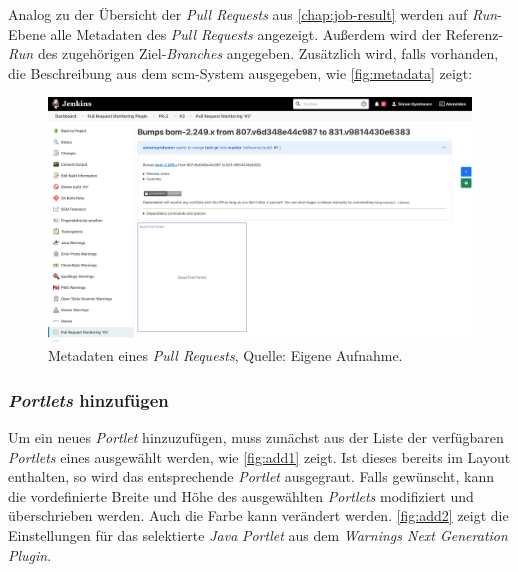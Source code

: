 Analog zu der Übersicht der \textit{Pull Requests} aus \autoref{chap:job-result} werden auf \textit{Run}-Ebene alle Metadaten des \textit{Pull Requests} angezeigt. Außerdem wird der Referenz-\textit{Run} des zugehörigen Ziel-\textit{Branches} angegeben. Zusätzlich wird, falls vorhanden, die Beschreibung aus dem \ac{scm}-System ausgegeben, wie \autoref{fig:metadata} zeigt:

\begin{figure}[h!]
\centering
\includegraphics[width=\textwidth]{source/images/metadata}
\caption[Metadaten eines \textit{Pull Requests}.]{Metadaten eines \textit{Pull Requests}, Quelle: Eigene Aufnahme.}
\label{fig:metadata}
\end{figure}

\subsubsection{\textit{Portlets} hinzufügen}
\label{chap:add}

Um ein neues \textit{Portlet} hinzuzufügen, muss zunächst aus der Liste der verfügbaren \textit{Portlets} eines ausgewählt werden, wie \autoref{fig:add1} zeigt. Ist dieses bereits im Layout enthalten, so wird das entsprechende \textit{Portlet} ausgegraut. Falls gewünscht, kann die vordefinierte Breite und Höhe des ausgewählten \textit{Portlets} modifiziert und überschrieben werden. Auch die Farbe kann verändert werden. \autoref{fig:add2} zeigt die Einstellungen für das selektierte \textit{Java} \textit{Portlet} aus dem \textit{Warnings Next Generation Plugin}.

